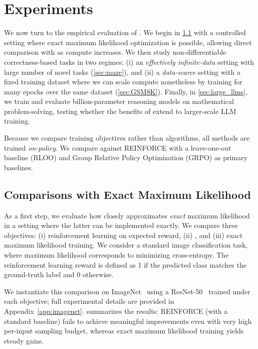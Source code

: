 \documentclass[10pt]{article} %
\begin{document}
\section{Experiments}
\label{sec:experiments}

We now turn to the empirical evaluation of \ours{}.
We begin in \cref{sec:imagenet} with a controlled setting where exact maximum likelihood optimization is possible, allowing direct comparison with \ours{} 
as compute increases. We then study non-differentiable correctness-based tasks in two regimes: (i) an \emph{effectively infinite-data} setting with large number of novel tasks (\cref{sec:maze}), and (ii) a \emph{data-scarce} setting with a fixed training dataset where we can scale compute nonetheless by training for many epochs over the same dataset (\cref{sec:GSM8K}). Finally, in \cref{sec:large_llms}, we train and evaluate billion-parameter reasoning models on mathematical problem-solving, testing whether the benefits of \ours{} extend to larger-scale LLM training.

Because we compare training objectives rather than algorithms, all methods are trained \emph{on-policy}. We compare against REINFORCE with a leave-one-out baseline (RLOO) \citep{ahmadian2024basicsrevisitingreinforcestyle} and Group Relative Policy Optimization (GRPO) \citep{shao2024deepseekmathpushinglimitsmathematical} as primary baselines.


\subsection{Comparisons with Exact Maximum Likelihood}
\label{sec:imagenet}

As a first step, we evaluate how closely \ours{} approximates \emph{exact} maximum likelihood in a setting where the latter can be implemented exactly. We compare three objectives: (i) reinforcement learning on expected reward, (ii) \ours{}, and (iii) exact maximum likelihood training. We consider a standard image classification task, where maximum likelihood corresponds to minimizing cross-entropy. The reinforcement learning reward is defined as 1 if the predicted class matches the ground-truth label and 0 otherwise.



We instantiate this comparison on ImageNet~\citep{deng2009imagenet} using a ResNet-50~\citep{he2015deepresiduallearningimage} trained under each objective; full experimental details are provided in Appendix~\ref{app:imagenet}.
 summarizes the results: REINFORCE (with a standard baseline) fails to achieve meaningful improvements even with very high per-input sampling budget, whereas exact maximum likelihood training yields steady gains.
\end{document}
